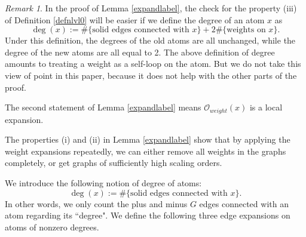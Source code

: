 \documentclass{article}
\makeatletter
\newcommand{\1}{\mathds{1}}
\numberwithin{equation}{section}
\newcommand{\al}{\alpha}
\newcommand{\be}{\begin{equation}}
\newcommand{\ee}{\end{equation}}
\renewcommand{\cal}{\mathcal}
\theoremstyle{plain} %
\newtheorem{definition}[theorem]{Definition}
\theoremstyle{remark}
\newtheorem{remark}[theorem]{Remark}
\renewcommand{\subsection}{\@startsection
	{subsection}%
	{2}%
	{0mm}%
	{-\baselineskip}%
	{0.5\baselineskip}%
	{\normalfont\bf\itshape}} %
\makeatother
\begin{document}
 \begin{remark}
In the proof of Lemma \ref{expandlabel}, the check for the property (iii) of Definition \ref{defnlvl0} will be easier if we define the degree of an atom $x$ as  
$${\deg}(x) := \# \{\text{solid edges connected with $x$}\} +2 \# \{\text{weights on $x$}\}.$$
Under this definition, the degrees of the old atoms are all unchanged, while the degree of the new atoms are all equal to 2. The above definition of degree amounts to treating a weight as a self-loop on the atom. But we do not take this view of point in this paper, because it does not help with the other parts of the proof.

The second statement of Lemma \ref{expandlabel} means $\cal O_{weight}(x)$ is a local expansion.

The properties (i) and (ii) in Lemma \ref{expandlabel} show that by applying the weight expansions repeatedly, we can either remove all weights in the graphs completely, or get graphs of sufficiently high scaling orders.
 \end{remark}

\fi



We introduce the following notion of degree of atoms: 
\be\label{degree}
{\deg}(x) := \# \{\text{solid edges connected with $x$}\} . 
\ee
In other words, we only count the plus and minus $G$ edges connected with an atom regarding its ``degree". We define the following three edge expansions on atoms of nonzero degrees.
\end{document}
